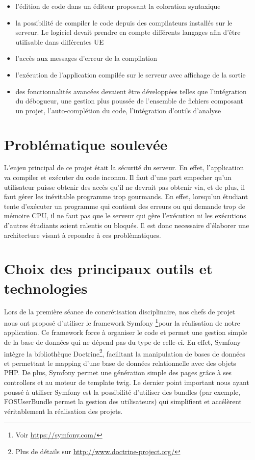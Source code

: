 \begin{itemize}

	\item l'édition de code dans un éditeur proposant la coloration syntaxique
	\item la possibilité de compiler le code depuis des compilateurs installés sur le serveur. Le logiciel devait prendre en compte différents langages afin d’être utilisable dans différentes UE
	\item l'accès aux messages d'erreur de la compilation
	\item l'exécution de l'application compilée sur le serveur avec affichage de la sortie
	\item des fonctionnalités avancées devaient être développées telles que l’intégration du débogueur, une gestion plus poussée de l’ensemble de fichiers composant un projet, l'auto-complétion du code, l'intégration d’outils d’analyse

\end{itemize}


\section{Problématique soulevée}

\par L'enjeu principal de ce projet était la sécurité du serveur. En effet, l'application va compiler et exécuter du code inconnu. Il faut d'une part empecher qu'un utilisateur puisse obtenir des accès qu'il ne devrait pas obtenir via, et de plus, il faut gérer les inévitable programme trop gourmands.  En effet, lorsqu'un étudiant tente d'exécuter un programme qui contient des erreurs ou qui demande trop de mémoire CPU, il ne faut pas que le serveur qui gère l'exécution ni les exécutions d'autres étudiants soient ralentis ou bloqués. Il est donc necessaire d'élaborer une architecture visant à repondre à ces problèmatiques.


\section{Choix des principaux outils et technologies}
\label{sec-principaux-outils}
\par Lors de la première séance de concrétisation disciplinaire, nos chefs de projet nous ont proposé d'utiliser le framework Symfony \footnote{Voir \url{https://symfony.com/}}pour la réalisation de notre application. Ce framework force à organiser le code et permet une gestion simple de la base de données qui ne dépend pas du type de celle-ci. En effet, Symfony intègre la bibliothèque Doctrine\footnote{Plus de détails sur \url{http://www.doctrine-project.org/}}, facilitant la manipulation de bases de données et permettant le mapping d'une base de données relationnelle avec des objets PHP. De plus, Symfony permet une génération simple des pages grâce à ses controllers et au moteur de template twig. Le dernier point important nous ayant poussé à utiliser Symfony est la possibilité d'utiliser des bundles (par exemple, FOSUserBundle permet la gestion des utilisateurs) qui simplifient et accélèrent véritablement la réalisation des projets. \\

